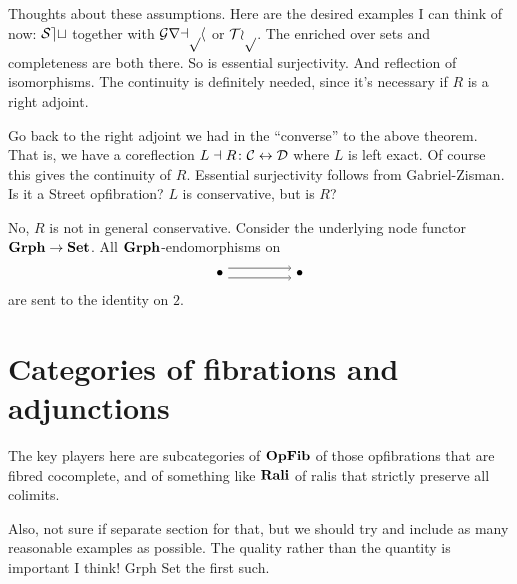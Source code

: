 \documentclass{amsart}
\begin{document}
Thoughts about these assumptions. Here are the desired examples I can think of now: $ \mathcal{Set} $ together with $ \mathcal{Graph} $ or $ \mathcal{Top} $. The enriched over sets and completeness are both there. So is essential surjectivity. And reflection of isomorphisms.  The continuity is definitely needed, since it's necessary if $ R $ is a right adjoint. 

Go back to the right adjoint we had in the ``converse'' to the above theorem.  That is, we have a coreflection $ L \dashv R \colon \mathcal{C} \leftrightarrow \mathcal{D} $ where $ L $ is left exact.  Of course this gives the continuity of $ R $. Essential surjectivity follows from Gabriel-Zisman. Is it a Street opfibration? $ L $ is conservative, but is $ R $?

\begin{ex}
  No, $ R $ is not in general conservative.
  Consider the underlying node functor
  $ \mathbf{Grph} \to \mathbf{Set} $.  All $ \mathbf{Grph} $-endomorphisms
  on
  \[
    \begin{tikzpicture}
      \node (a) at (0,0) {$ \bullet $};
      \node (b) at (2,0) {$ \bullet $};
      \draw [->] (a.30) to (b.150);
      \draw [->] (a.-30) to (b.-150);
    \end{tikzpicture}
  \]
  are sent to the identity on $ 2 $.
\end{ex}

\section{Categories of fibrations and adjunctions}

The key players here are subcategories of $\mathbf{OpFib}$ of those opfibrations that are fibred cocomplete, and of something like
$\mathbf{Rali}$ of ralis that strictly preserve all colimits.

{\chris Also, not sure if separate section for that, but we should try and include as many reasonable examples as possible. The quality rather
than the quantity is important I think! Grph Set the first such.}



\end{document}
